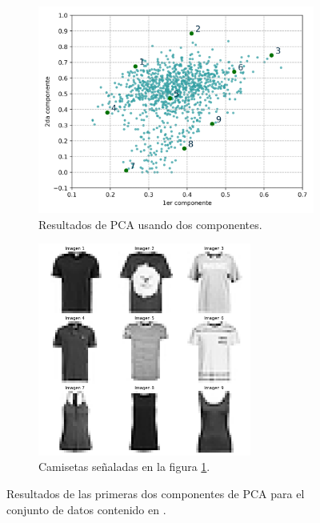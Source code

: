\begin{figure}[H]
    \centering
    \begin{subfigure}{9.5cm}
        \includegraphics[width=9.5cm]{Graphics/Problema_3_1/loadings_2d.png}
        \caption{Resultados de PCA usando dos componentes.}
        \label{fig:problema5_pca_2d}
    \end{subfigure}
    \begin{subfigure}{7cm}
        \includegraphics[width=7cm]{Graphics/Problema_3_1/T_shirts_2d.png}
        \caption{Camisetas señaladas en la figura \ref{fig:problema5_pca_2d}.}
        \label{fig:problema5_pca_2d_camisetas}
    \end{subfigure}
    \caption{Resultados de las primeras dos componentes de PCA para el conjunto de datos contenido en .}
    \label{fig:pca_2d}
\end{figure}

